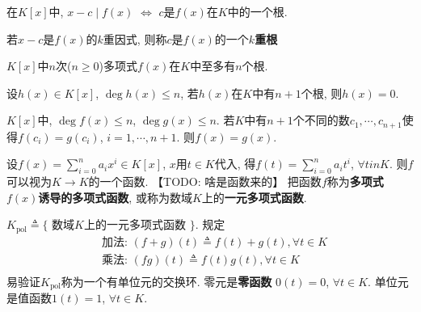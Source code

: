 \begin{Theorem}[!, Bezout定理]
在$K[x]$中, $x - c \mid f(x)$ $\iff$ $c$是$f(x)$在$K$中的一个根.
\end{Theorem}

\begin{Definition}
若$x-c$是$f(x)$的$k$重因式, 则称$c$是$f(x)$的一个\textbf{$k$重根}
\end{Definition}



\begin{Theorem}
$K[x]$中$n$次($n \ge 0$)多项式$f(x)$在$K$中至多有$n$个根.
\end{Theorem}

\begin{Corollary}
设$h(x) \in K[x]$, $\deg h(x) \le n$, 若$h(x)$在$K$中有$n+1$个根, 则$h(x) = 0$.
\end{Corollary}

\begin{Proposition} 
$K[x]$中, $\deg f(x) \le n$, $\deg g(x) \le n$. 若$K$中有$n+1$个不同的数$c_1, \cdots, c_{n+1}$使得$f(c_i) = g(c_i)$, $i=1, \cdots, n+1$. 则$f(x) = g(x)$.
\end{Proposition}

\begin{Definition}
设$f(x) = \sum\limits_{i=0}^n a_i x^i \in K[x]$, $x$用$t \in K$代入, 得$f(t) = \sum\limits_{i=0}^n a_i t^i$, $\forall t in K$. 则$f$可以视为$K \rightarrow K$的一个函数. 【TODO: 啥是函数来的】 
把函数$f$称为\textbf{多项式$f(x)$诱导的多项式函数}, 或称为数域$K$上的\textbf{一元多项式函数}.
\end{Definition}

\begin{Note}
$K_\text{pol} \triangleq $\;$\{$ 数域$K$上的一元多项式函数 $\}$. 规定
\[
\begin{aligned}
&\text{加法: } (f + g)(t) \triangleq f(t) + g(t), \forall t \in K \\
&\text{乘法: } (fg)(t) \triangleq f(t) g(t), \forall t \in K \\
\end{aligned}
\]
易验证$K_\text{pol}$称为一个有单位元的交换环. 零元是\textbf{零函数} $0(t) = 0$, $\forall t \in K$. 单位元是值函数$1(t) = 1$, $\forall t \in K$.
\end{Note}

